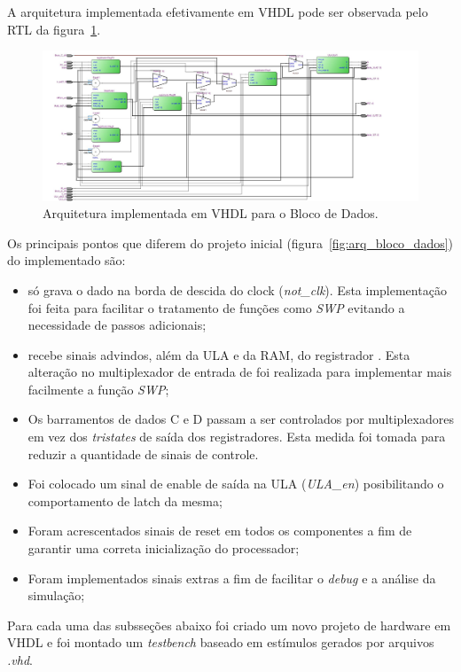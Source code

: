\documentclass[../main.tex]{subfiles}
\begin{document}
	A arquitetura implementada efetivamente em VHDL pode ser observada pelo RTL da figura~\ref{fig:bloco_dados_RTL}.
	
	\begin{figure}[H]
		\centering
		\includegraphics[width=\textwidth]{img/bloco_dados_RTL}
		\caption{Arquitetura implementada em VHDL para o Bloco de Dados.}
		\label{fig:bloco_dados_RTL}
	\end{figure}
	
	Os principais pontos que diferem do projeto inicial (figura~\ref{fig:arq_bloco_dados}) do implementado são:
	\begin{itemize}
		\item \A{} só grava o dado na borda de descida do clock (\textit{not\_clk}). Esta implementação foi feita para facilitar o tratamento de funções como \textit{SWP} evitando a necessidade de passos adicionais;
		\item \A{} recebe sinais advindos, além da ULA e da RAM, do registrador \B{}. Esta alteração no multiplexador de entrada de \A{} foi realizada para implementar mais facilmente a função \textit{SWP};
		\item Os barramentos de dados C e D passam a ser controlados por multiplexadores em vez dos \textit{tristates} de saída dos registradores. Esta medida foi tomada para reduzir a quantidade de sinais de controle.
		\item Foi colocado um sinal de enable de saída na ULA (\textit{ULA\_en}) posibilitando o comportamento de latch da mesma;
		\item Foram acrescentados sinais de reset em todos os componentes a fim de garantir uma correta inicialização do processador;
		\item Foram implementados sinais extras a fim de facilitar o \textit{debug} e a análise da simulação;
	\end{itemize}
	
	Para cada uma das subsseções abaixo foi criado um novo projeto de hardware em VHDL e foi montado um \textit{testbench}
	baseado em estímulos gerados por arquivos \textit{.vhd}.
	
\end{document}
